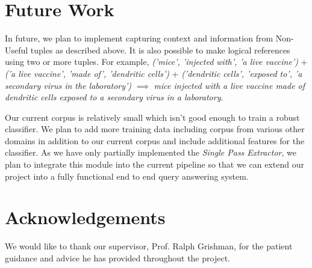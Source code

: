 \documentclass{article}
\begin{document}
\section{Future Work}

In future, we plan to implement capturing context and information from Non-Useful tuples as described above. It is also possible to make logical references using two or more tuples. For example, \textit{('mice', 'injected with', 'a live vaccine')} + \textit{('a live vaccine', 'made of', 'dendritic cells')} + \textit{('dendritic cells', 'exposed to', 'a secondary virus in the laboratory')} $\implies$ \textit{mice injected with a live vaccine made of dendritic cells exposed to a secondary virus in a laboratory}.

Our current corpus is relatively small which isn't good enough to train a robust classifier. We plan to add more training data including corpus from various other domains in addition to our current corpus and include additional features for the classifier. As we have only partially implemented the \textit{Single Pass Extractor}, we plan to integrate this module into the current pipeline so that we can extend our project into a fully functional end to end query answering system. 

\section{Acknowledgements}
We would like to thank our supervisor, Prof. Ralph Grishman, for the patient guidance and advice he has provided throughout the project.

{}

\nocite{*}
\end{document}

